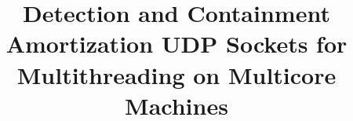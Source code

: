 \documentclass[journal]{IEEEtran}
\begin{document}
%
\title{Detection and Containment Amortization UDP Sockets for Multithreading on Multicore Machines}
%
%
%



\author{
\\
}

% 
%
\end{document}
